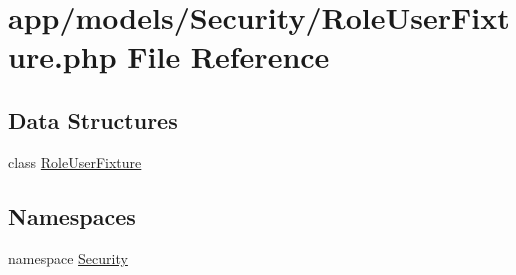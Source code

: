 \hypertarget{_role_user_fixture_8php}{\section{app/models/\-Security/\-Role\-User\-Fixture.php File Reference}
\label{_role_user_fixture_8php}
}
\subsection*{Data Structures}
\begin{DoxyCompactItemize}
\item 
class \hyperlink{class_security_1_1_role_user_fixture}{Role\-User\-Fixture}
\end{DoxyCompactItemize}
\subsection*{Namespaces}
\begin{DoxyCompactItemize}
\item 
namespace \hyperlink{namespace_security}{Security}
\end{DoxyCompactItemize}
